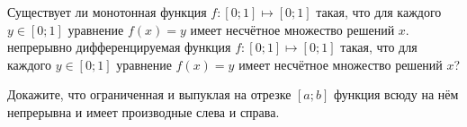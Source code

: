 \documentclass[10pt]{article}
\begin{document}
\vspace{-1ex}

\begin{problem}

 Существует ли монотонная функция $f : [0; 1] \mapsto [0; 1]$ такая, что для каждого $y \in [0; 1]$ уравнение $f(x) = y$ имеет несчётное множество решений $x$.
непрерывно дифференцируемая функция $f : [0; 1] \mapsto [0; 1]$ такая, что для каждого $y \in [0; 1]$ уравнение $f(x) = y$ имеет несчётное множество решений $x$?
\end{problem}

\begin{problem}
Докажите, что ограниченная и выпуклая на отрезке $[a; b]$ функция всюду на нём непрерывна и имеет производные слева и справа.
\end{problem}
\end{document}
